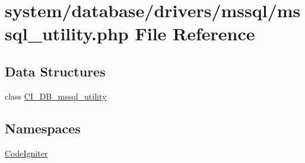 \hypertarget{mssql__utility_8php}{\section{system/database/drivers/mssql/mssql\-\_\-utility.php File Reference}
\label{mssql__utility_8php}
}
\subsection*{Data Structures}
\begin{DoxyCompactItemize}
\item 
class \hyperlink{class_c_i___d_b__mssql__utility}{C\-I\-\_\-\-D\-B\-\_\-mssql\-\_\-utility}
\end{DoxyCompactItemize}
\subsection*{Namespaces}
\begin{DoxyCompactItemize}
\item 
\hyperlink{namespace_code_igniter}{Code\-Igniter}
\end{DoxyCompactItemize}
